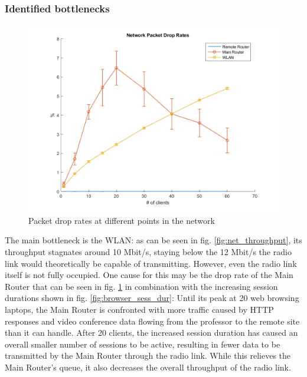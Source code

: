 \documentclass[
10pt, %
a4paper, %
oneside, %
headinclude,footinclude, %
BCOR5mm, %
]{scrartcl}
\begin{document}
\subsubsection{Identified bottlenecks}
\begin{figure}[!ht]
  \centering
  \includegraphics[width=\textwidth]{Figures/nocctv/Network_Packet_Drop_Rates.png}
  \caption{Packet drop rates at different points in the network} \label{fig:net_drop}
\end{figure}


The main bottleneck is the WLAN: as can be seen in fig. \ref{fig:net_throughput}, its throughput stagnates around 10 Mbit/s, staying below the 12 Mbit/s the radio link would theoretically be capable of transmitting. However, even the radio link itself is not fully occupied. One cause for this may be the drop rate of the Main Router that can be seen in fig. \ref{fig:net_drop} in combination with the increasing session durations shown in fig. \ref{fig:browser_sess_dur}: Until its peak at 20 web browsing laptops, the Main Router is confronted with more traffic caused by HTTP responses and video conference data flowing from the professor to the remote site than it can handle. After 20 clients, the increased session duration has caused an overall smaller number of sessions to be active, resulting in fewer data to be transmitted by the Main Router through the radio link. While this relieves the Main Router's queue, it also decreases the overall throughput of the radio link.
\end{document}
